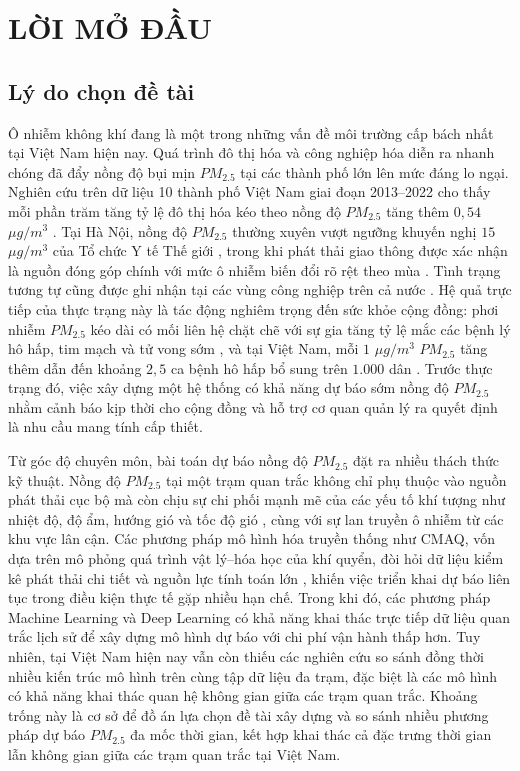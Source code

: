 \chapter*{LỜI MỞ ĐẦU}

\section{Lý do chọn đề tài}

Ô nhiễm không khí đang là một trong những vấn đề môi trường cấp bách nhất tại Việt Nam hiện nay. Quá trình đô thị hóa và công nghiệp hóa diễn ra nhanh chóng đã đẩy nồng độ bụi mịn $PM_{2.5}$ tại các thành phố lớn lên mức đáng lo ngại. Nghiên cứu trên dữ liệu 10 thành phố Việt Nam giai đoạn 2013--2022 cho thấy mỗi phần trăm tăng tỷ lệ đô thị hóa kéo theo nồng độ $PM_{2.5}$ tăng thêm $0{,}54$ $\mu g/m^3$ \cite{bui2025urbanization}. Tại Hà Nội, nồng độ $PM_{2.5}$ thường xuyên vượt ngưỡng khuyến nghị $15$ $\mu g/m^3$ của Tổ chức Y tế Thế giới \cite{dam2024pm25}, trong khi phát thải giao thông được xác nhận là nguồn đóng góp chính với mức ô nhiễm biến đổi rõ rệt theo mùa \cite{ho2025assessment}. Tình trạng tương tự cũng được ghi nhận tại các vùng công nghiệp trên cả nước \cite{rti2024pollution}. Hệ quả trực tiếp của thực trạng này là tác động nghiêm trọng đến sức khỏe cộng đồng: phơi nhiễm $PM_{2.5}$ kéo dài có mối liên hệ chặt chẽ với sự gia tăng tỷ lệ mắc các bệnh lý hô hấp, tim mạch và tử vong sớm \cite{le2024environmental}, và tại Việt Nam, mỗi $1$ $\mu g/m^3$ $PM_{2.5}$ tăng thêm dẫn đến khoảng $2{,}5$ ca bệnh hô hấp bổ sung trên $1.000$ dân \cite{bui2025urbanization}. Trước thực trạng đó, việc xây dựng một hệ thống có khả năng dự báo sớm nồng độ $PM_{2.5}$ nhằm cảnh báo kịp thời cho cộng đồng và hỗ trợ cơ quan quản lý ra quyết định là nhu cầu mang tính cấp thiết.

Từ góc độ chuyên môn, bài toán dự báo nồng độ $PM_{2.5}$ đặt ra nhiều thách thức kỹ thuật. Nồng độ $PM_{2.5}$ tại một trạm quan trắc không chỉ phụ thuộc vào nguồn phát thải cục bộ mà còn chịu sự chi phối mạnh mẽ của các yếu tố khí tượng như nhiệt độ, độ ẩm, hướng gió và tốc độ gió \cite{dam2024pm25}, cùng với sự lan truyền ô nhiễm từ các khu vực lân cận. Các phương pháp mô hình hóa truyền thống như CMAQ, vốn dựa trên mô phỏng quá trình vật lý--hóa học của khí quyển, đòi hỏi dữ liệu kiểm kê phát thải chi tiết và nguồn lực tính toán lớn \cite{ho2025assessment}, khiến việc triển khai dự báo liên tục trong điều kiện thực tế gặp nhiều hạn chế. Trong khi đó, các phương pháp Machine Learning và Deep Learning có khả năng khai thác trực tiếp dữ liệu quan trắc lịch sử để xây dựng mô hình dự báo với chi phí vận hành thấp hơn. Tuy nhiên, tại Việt Nam hiện nay vẫn còn thiếu các nghiên cứu so sánh đồng thời nhiều kiến trúc mô hình trên cùng tập dữ liệu đa trạm, đặc biệt là các mô hình có khả năng khai thác quan hệ không gian giữa các trạm quan trắc. Khoảng trống này là cơ sở để đồ án lựa chọn đề tài xây dựng và so sánh nhiều phương pháp dự báo $PM_{2.5}$ đa mốc thời gian, kết hợp khai thác cả đặc trưng thời gian lẫn không gian giữa các trạm quan trắc tại Việt Nam.

